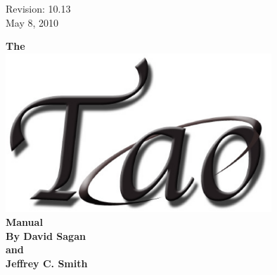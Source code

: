 \thispagestyle{empty}

\begin{flushright}
\large
  Revision: 10.13 \\
  May 8, 2010 \\
\end{flushright}

\vfill

{
\begin{center}
{\Huge \sf\bf The} \\
\vskip 0.1in
\includegraphics[width=10cm]{tao.eps} \\
\vskip 0.1in
{\Huge \sf\bf Manual} \\
\vskip 0.4in
{\Large \sf\bf By David Sagan \\ and \\ Jeffrey C. Smith} \\
\end{center}
}

\vfill
\break
